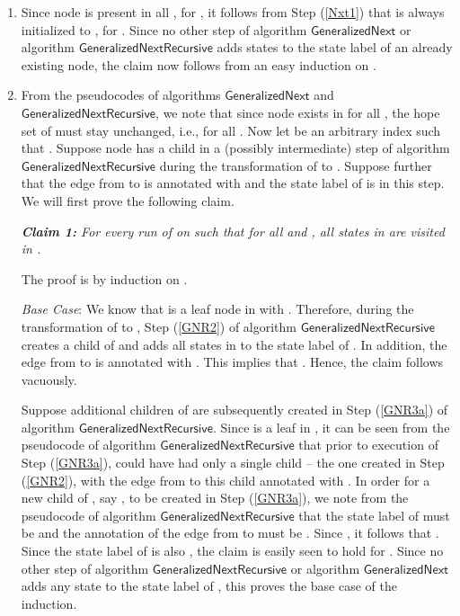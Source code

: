 \documentclass[3p]{elsarticle}
\newcommand{\algo}[1]{\ensuremath{\textsf{{#1}}}}
\begin{document}
\begin{enumerate}
\item Since node  is present in all , for , it follows from Step (\ref{Nxt1}) that 
  is always initialized to ,
  for .  Since no other step of algorithm
  \algo{GeneralizedNext} or algorithm \algo{GeneralizedNextRecursive}
  adds states to the state label of an already existing node, the
  claim now follows from an easy induction on .

\item From the pseudocodes of algorithms \algo{GeneralizedNext} and
  \algo{GeneralizedNextRecursive}, we note that since node  exists
  in  for all , the hope set of 
  must stay unchanged, i.e.,  for all .  Now let  be an arbitrary index such that .  Suppose node  has a child  in a (possibly
  intermediate) step of algorithm \algo{GeneralizedNextRecursive}
  during the transformation of  to .  Suppose further
  that the edge from  to  is annotated with  and the state
  label of  is  in this step.  We will first prove the
  following claim.

  \emph{{\bfseries Claim 1:} For every run  of  on
     such that  for all  and , all states in
     are visited
    in .}

    The proof is by induction on .

    \noindent \emph{Base Case}: We know that  is a leaf node in
     with .  Therefore, during the
    transformation of  to , Step (\ref{GNR2}) of
    algorithm \algo{GeneralizedNextRecursive} creates a child  of
     and adds all states in  to the
    state label of .  In addition, the edge from  to  is
    annotated with .  This implies that .  Hence,
    the claim follows vacuously.

    Suppose additional children of  are subsequently created in
    Step (\ref{GNR3a}) of algorithm \algo{GeneralizedNextRecursive}.
    Since  is a leaf in , it can be seen from the pseudocode
    of algorithm \algo{GeneralizedNextRecursive} that prior to
    execution of Step (\ref{GNR3a}),  could have had only a single
    child -- the one created in Step (\ref{GNR2}), with the edge from
     to this child annotated with .  In order for
    a new child of , say , to be created in Step
    (\ref{GNR3a}), we note from the pseudocode of algorithm
    \algo{GeneralizedNextRecursive} that the state label of  must
    be  and the annotation of the edge from  to 
    must be .
    Since , it follows that .  Since the state label of
     is also , the claim is easily seen to hold for
    .  Since no other step of algorithm
    \algo{GeneralizedNextRecursive} or algorithm
    \algo{GeneralizedNext} adds any state to the state label of ,
    this proves the base case of the induction.


\end{enumerate}
\end{document}
